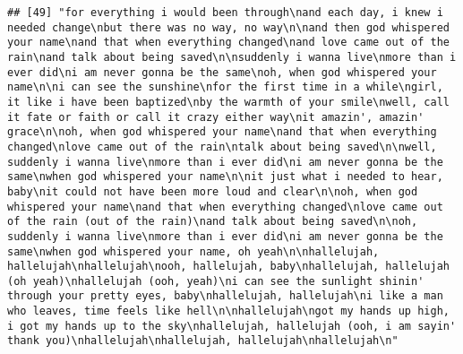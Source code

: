 \documentclass[]{article}
\begin{document}
\begin{verbatim}
## [49] "for everything i would been through\nand each day, i knew i needed change\nbut there was no way, no way\n\nand then god whispered your name\nand that when everything changed\nand love came out of the rain\nand talk about being saved\n\nsuddenly i wanna live\nmore than i ever did\ni am never gonna be the same\noh, when god whispered your name\n\ni can see the sunshine\nfor the first time in a while\ngirl, it like i have been baptized\nby the warmth of your smile\nwell, call it fate or faith or call it crazy either way\nit amazin', amazin' grace\n\noh, when god whispered your name\nand that when everything changed\nlove came out of the rain\ntalk about being saved\n\nwell, suddenly i wanna live\nmore than i ever did\ni am never gonna be the same\nwhen god whispered your name\n\nit just what i needed to hear, baby\nit could not have been more loud and clear\n\noh, when god whispered your name\nand that when everything changed\nlove came out of the rain (out of the rain)\nand talk about being saved\n\noh, suddenly i wanna live\nmore than i ever did\ni am never gonna be the same\nwhen god whispered your name, oh yeah\n\nhallelujah, hallelujah\nhallelujah\nooh, hallelujah, baby\nhallelujah, hallelujah (oh yeah)\nhallelujah (ooh, yeah)\ni can see the sunlight shinin' through your pretty eyes, baby\nhallelujah, hallelujah\ni like a man who leaves, time feels like hell\n\nhallelujah\ngot my hands up high, i got my hands up to the sky\nhallelujah, hallelujah (ooh, i am sayin' thank you)\nhallelujah\nhallelujah, hallelujah\nhallelujah\n"                                                                                                                                                                                                                                                                                                                                                                                                                                                                                                                                                                                                                                                                                                                                                                                                                                                                                                                                                                                                                                                                                                                                                                                                                                                                                                                                                                  

\end{verbatim}
\end{document}
